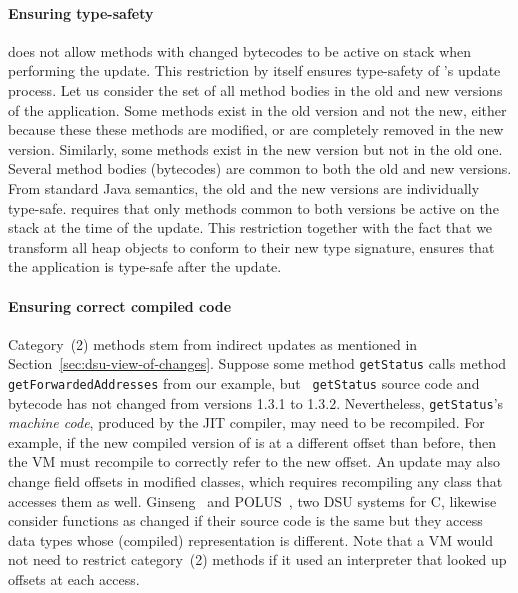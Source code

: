 \paragraph{Ensuring type-safety}

\JV does not allow methods with changed bytecodes to
be active on stack when performing the update. This restriction by itself
ensures type-safety of \JV's update process. Let us consider the set of
all method bodies in the old and new versions of the application. Some
methods exist in the old version and not the new, either because these
these methods are modified, or are completely removed in the new version.
Similarly, some methods exist in the new version but not in the old one.
Several method bodies (bytecodes) are common to both the old and
new versions. From standard Java semantics, the old and the new
versions are individually type-safe. \JV requires that only methods
common to both versions be active on the stack at the time of the update.
This restriction together with the fact that we transform all heap objects
to conform to their new type signature, ensures that the
application is type-safe after the update.

\paragraph{Ensuring correct compiled code}

Category~(2) methods stem from indirect updates as mentioned in
Section~\ref{sec:dsu-view-of-changes}. Suppose some method {\tt getStatus}
calls method {\tt getForwardedAddresses} from our example, but {\tt
getStatus} source code and bytecode has not changed from versions 1.3.1 to
1.3.2.  Nevertheless, {\tt getStatus}'s \emph{machine code}, produced by
the JIT compiler, may need to be recompiled.  For example, if the new
compiled version of \getForwardedAddresses is at a different offset
than before, then the VM must recompile \getStatus to correctly refer
to the new offset.  An update may also change field offsets in modified
classes, which requires recompiling any class that accesses them as well.
Ginseng~\cite{neamtiu06dsu} and POLUS~\cite{chen:icse07}, two DSU systems
for C, likewise consider functions as changed if their source code is the
same but they access data types whose (compiled) representation is
different.  Note that a VM would not need to restrict category~(2)
methods if it used an interpreter that looked up offsets at each access.

